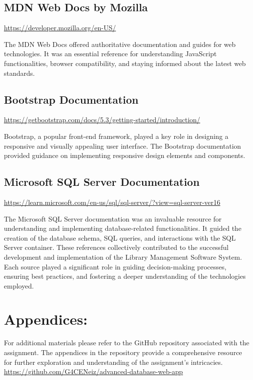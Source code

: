 \documentclass[12pt,titlepage,a4paper]{report}
\begin{document}
\subsection{MDN Web Docs by Mozilla}
\noindent \url{https://developer.mozilla.org/en-US/}

The MDN Web Docs offered authoritative documentation and guides for web technologies. It was an essential reference for understanding JavaScript functionalities, browser compatibility, and staying informed about the latest web standards.

\subsection{Bootstrap Documentation}
\noindent \url{https://getbootstrap.com/docs/5.3/getting-started/introduction/}

Bootstrap, a popular front-end framework, played a key role in designing a responsive and visually appealing user interface. The Bootstrap documentation provided guidance on implementing responsive design elements and components.

\subsection{Microsoft SQL Server Documentation}
\noindent \url{https://learn.microsoft.com/en-us/sql/sql-server/?view=sql-server-ver16}

The Microsoft SQL Server documentation was an invaluable resource for understanding and implementing database-related functionalities. It guided the creation of the database schema, SQL queries, and interactions with the SQL Server container.
These references collectively contributed to the successful development and implementation of the Library Management Software System. Each source played a significant role in guiding decision-making processes, ensuring best practices, and fostering a deeper understanding of the technologies employed.

\section{Appendices:}
For additional materials please refer to the GitHub repository associated with the assignment. The appendices in the repository provide a comprehensive resource for further exploration and understanding of the assignment's intricacies.
\noindent \url{https://github.com/G4CENeiz/advanced-database-web-app}
\end{document}
